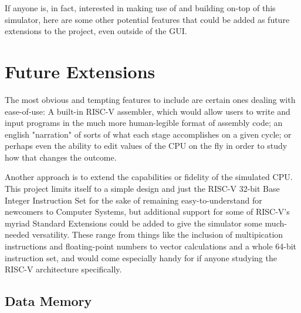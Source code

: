 \documentclass[12pt,twoside]{reedthesis}
\begin{document}
If anyone is, in fact, interested in making use of and building on-top of this simulator, here are some other potential features that could be added as future extensions to the project, even outside of the GUI.

\section*{Future Extensions}

The most obvious and tempting features to include are certain ones dealing with ease-of-use: A built-in RISC-V assembler, which would allow users to write and input programs in the much more human-legible format of assembly code; an english "narration" of sorts of what each stage accomplishes on a given cycle; or perhaps even the ability to edit values of the CPU on the fly in order to study how that changes the outcome.

Another approach is to extend the capabilities or fidelity of the simulated CPU. This project limits itself to a simple design and just the RISC-V 32-bit Base Integer Instruction Set  for the sake of remaining easy-to-understand for newcomers to Computer Systems, but additional support for some of RISC-V's myriad Standard Extensions could be added to give the simulator some much-needed versatility. These range from things like the inclusion of multipication instructions and floating-point numbers to vector calculations and a whole 64-bit instruction set, and would come especially handy for if anyone studying the RISC-V architecture specifically.

\subsection*{Data Memory}
\end{document}
